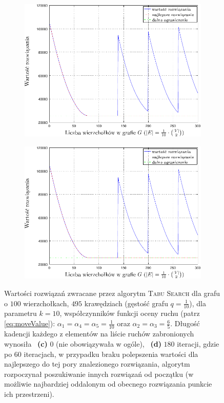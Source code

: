 \begin{figure}[!htbp]
	\ContinuedFloat
	\null\hfill
	\begin{subfigure}[b]{0.45\textwidth}
		\includegraphics[width=\textwidth]{Chapter_VI/RRIMST3-example/RRIMST3_psfrag}
		\caption{}
		\label{fig:rrimst1:c}
	\end{subfigure}
	\hfill
	\begin{subfigure}[b]{0.45\textwidth}
		\includegraphics[width=\textwidth]{Chapter_VI/RRIMST4-example/RRIMST4_psfrag}
		\caption{}
		\label{fig:rrimst1:d}
	\end{subfigure}
	\hfill\null
	\caption{
		Wartości rozwiązań zwracane przez algorytm \textsc{Tabu Search} dla grafu o $100$ wierzchołkach, $495$ krawędziach (gęstość grafu $q = \frac{1}{10}$), dla parametru $k = 10$, współczynników funkcji oceny ruchu (patrz \ref{eq:moveValue}): $\alpha_{1} = \alpha_{4} = \alpha_{5} = \frac{1}{10}$ oraz $\alpha_{2} = \alpha_{3} = \frac{6}{5}$. Długość kadencji każdego z elementów na liście ruchów zabronionych wynosiła ~\textbf{(c)} $0$ (nie obowiązywała w ogóle), ~\textbf{(d)} $180$ iteracji, gdzie po $60$ iteracjach, w przypadku braku polepszenia wartości dla najlepszego do tej pory znalezionego rozwiązania, algorytm rozpoczynał poszukiwanie innych rozwiązań od początku (w możliwie najbardziej oddalonym od obecnego rozwiązania punkcie ich przestrzeni).
	}
	\label{fig:rrimst1}
\end{figure}

